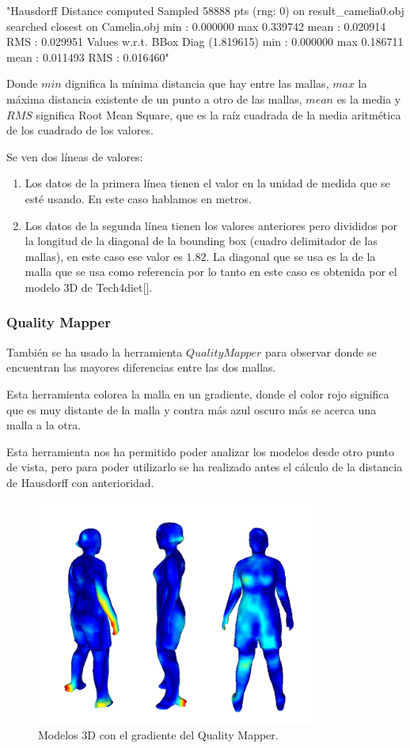 \begin{python}
	"Hausdorff Distance computed
	Sampled 58888 pts (rng: 0) on result_camelia0.obj searched closest on Camelia.obj
	min : 0.000000 max 0.339742 mean : 0.020914 RMS : 0.029951
	Values w.r.t. BBox Diag (1.819615)
	min : 0.000000 max 0.186711 mean : 0.011493 RMS : 0.016460"
\end{python}

Donde $min$ dignifica la mínima distancia que hay entre las mallas, $max$ la máxima distancia existente de un punto a otro de las mallas, $mean$ es la media y $RMS$ significa Root Mean Square, que es la raíz cuadrada de la media aritmética de los cuadrado de los valores.

Se ven dos líneas de valores:
\begin{enumerate}
	\item Los datos de la primera línea tienen el valor en la unidad de medida que se esté usando. En este caso hablamos en metros.
	\item Los datos de la segunda línea tienen los valores anteriores pero divididos por la longitud de la diagonal de la bounding box (cuadro delimitador de las mallas), en este caso ese valor es $1.82$. La diagonal que se usa es la de la malla que se usa como referencia por lo tanto en este caso es obtenida por el modelo 3D de Tech4diet[\cite{tech}].
\end{enumerate}

\subsubsection{Quality Mapper}

También se ha usado la herramienta $Quality Mapper$ para observar donde se encuentran las mayores diferencias entre las dos mallas.

Esta herramienta colorea la malla en un gradiente, donde el color rojo significa que es muy distante de la malla y contra más azul oscuro más se acerca una malla a la otra.

Esta herramienta nos ha permitido poder analizar los modelos desde otro punto de vista, pero para poder utilizarlo se ha realizado antes el cálculo de la distancia de Hausdorff con anterioridad.

\begin{figure}[H]
	\centering
	\includegraphics[scale=0.7]{imagenes/qualitymapper.png}
	\caption{Modelos 3D con el gradiente del Quality Mapper.}
	\label{fig:qualitymapper}
\end{figure}


